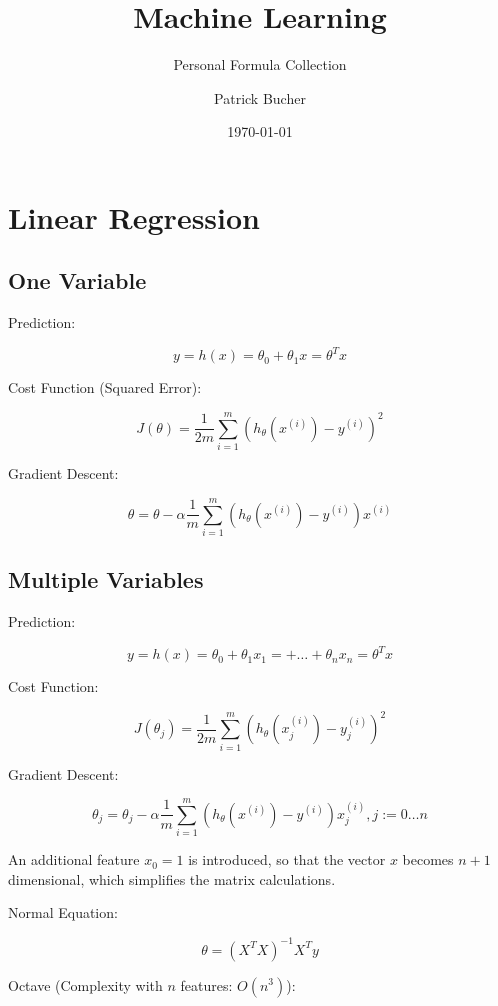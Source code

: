\documentclass[a4paper,11pt]{scrartcl}
\begin{document}
\author{Patrick Bucher}
\title{Machine Learning}
\subtitle{Personal Formula Collection}
\date{\today}
\maketitle

\tableofcontents

\section{Linear Regression}

\subsection{One Variable}

Prediction:

$$ y = h(x) = \theta_0 + \theta_1 x = \theta^T x $$

Cost Function (Squared Error):

$$ J(\theta) = \frac{1}{2m} \sum_{i=1}^{m} (h_{\theta}(x^{(i)}) - y^{(i)})^2 $$

Gradient Descent:

$$ \theta = \theta - \alpha \frac{1}{m} \sum_{i=1}^{m} (h_{\theta}(x^{(i)}) - y^{(i)}) x^{(i)} $$

\subsection{Multiple Variables}

Prediction:

$$ y = h(x) = \theta_0 + \theta_1 x_1 = + \dots + \theta_n x_n = \theta^T x $$

Cost Function:

$$ J(\theta_j) = \frac{1}{2m} \sum_{i=1}^{m} (h_{\theta}(x^{(i)}_j) - y^{(i)}_j)^2 $$

Gradient Descent:

$$ \theta_j = \theta_j - \alpha \frac{1}{m} \sum_{i=1}^{m} (h_{\theta}(x^{(i)}) - y^{(i)}) x^{(i)}_j, j := 0 \dots n $$

An additional feature $x_0=1$ is introduced, so that the vector $x$ becomes $n+1$ dimensional, which simplifies the matrix calculations.

\medskip

Normal Equation:

$$ \theta = (X^T X)^{-1} X^T y $$

Octave (Complexity with $n$ features: $O(n^3)$):
\end{document}
